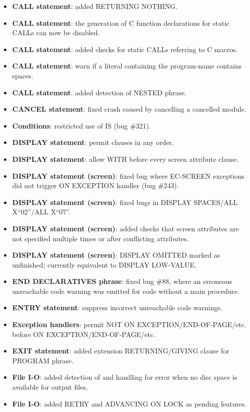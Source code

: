 \begin{itemize}
\item \textbf{CALL statement}: added RETURNING NOTHING.
\item \textbf{CALL statement}: the generation of C function declarations for static CALLs can now be disabled.
\item \textbf{CALL statement}: added checks for static CALLs referring to C macros.
\item \textbf{CALL statement}: warn if a literal containing the program-name contains spaces.
\item \textbf{CALL statement}: added detection of NESTED phrase.
\item \textbf{CANCEL statement}: fixed crash caused by cancelling a cancelled module.
\item \textbf{Conditions}: restricted use of IS (bug \#321).
\item \textbf{DISPLAY statement}: permit clauses in any order.
\item \textbf{DISPLAY statement}: allow WITH before every screen attribute clause.
\item \textbf{DISPLAY statement (screen)}: fixed bug where EC-SCREEN exceptions did not trigger ON EXCEPTION handler (bug \#243).
\item \textbf{DISPLAY statement (screen)}: fixed bugs in DISPLAY SPACES\slash{}ALL X``02''\slash{}ALL X``07''.
\item \textbf{DISPLAY statement (screen)}: added checks that screen attributes are not specified multiple times or after conflicting attributes.
\item \textbf{DISPLAY statement (screen)}: DISPLAY OMITTED marked as unfinished; currently equivalent to DISPLAY LOW-VALUE.
\item \textbf{END DECLARATIVES phrase}: fixed bug \#88, where an erroneous unreachable code warning was emitted for code without a main procedure.
\item \textbf{ENTRY statement}: suppress incorrect unreachable code warnings.
\item \textbf{Exception handlers}: permit NOT ON EXCEPTION\slash{}END-OF-PAGE\slash{}etc. before ON EXCEPTION\slash{}END-OF-PAGE\slash{}etc.
\item \textbf{EXIT statement}: added extension RETURNING\slash{}GIVING clause for PROGRAM phrase.
\item \textbf{File I-O}: added detection of and handling for error when no disc space is available for output files.
\item \textbf{File I-O}: added RETRY and ADVANCING ON LOCK as pending features.

\end{itemize}
